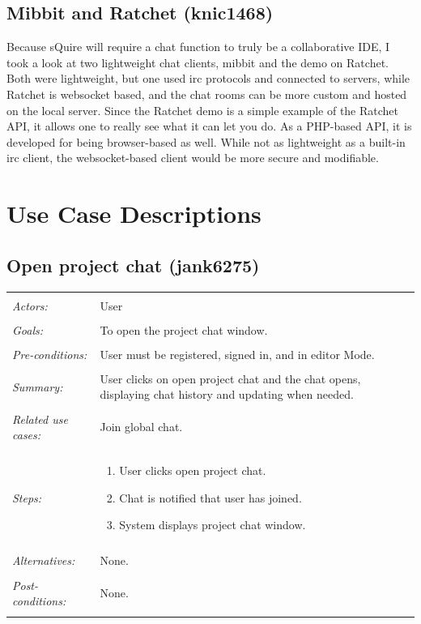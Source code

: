 \documentclass[11pt]{report}
\begin{document}
\subsection{Mibbit and Ratchet (knic1468)}
Because sQuire will require a chat function to truly be a collaborative IDE, I took a look at two lightweight chat clients, mibbit and the demo on Ratchet. Both were lightweight, but one used irc protocols and connected to servers, while Ratchet is websocket based, and the chat rooms can be more custom and hosted on the local server. Since the Ratchet demo is a simple example of the Ratchet API, it allows one to really see what it can let you do. As a PHP-based API, it is developed for being browser-based as well. While not as lightweight as a built-in irc client, the websocket-based client would be more secure and modifiable.



\section{Use Case Descriptions}
\subsection{Open project chat (jank6275)}
\begin{tabular}{ p{2cm} p{12cm} }
 \hline
 \\
 \textit{Actors:} & User \\ 
 \\
 \textit{Goals:} & To open the project chat window. \\
 \\
 \textit{Pre-conditions:} & User must be registered, signed in, and in editor Mode.  \\
 \\
 \textit{Summary:} & User clicks on open project chat and the chat opens, displaying chat history and updating when needed. \\ 
 \\
 \textit{Related use cases:} & Join global chat. \\ 
 \\
 \textit{Steps:} & \begin{enumerate}
  \item User clicks open project chat.
  \item Chat is notified that user has joined.
  \item System displays project chat window.
 \end{enumerate} \\
 \\
 \textit{Alternatives:} & None. \\
 \\
 \textit{Post-conditions:} & None. \\
 \\
\hline
\end{tabular}
\end{document}
